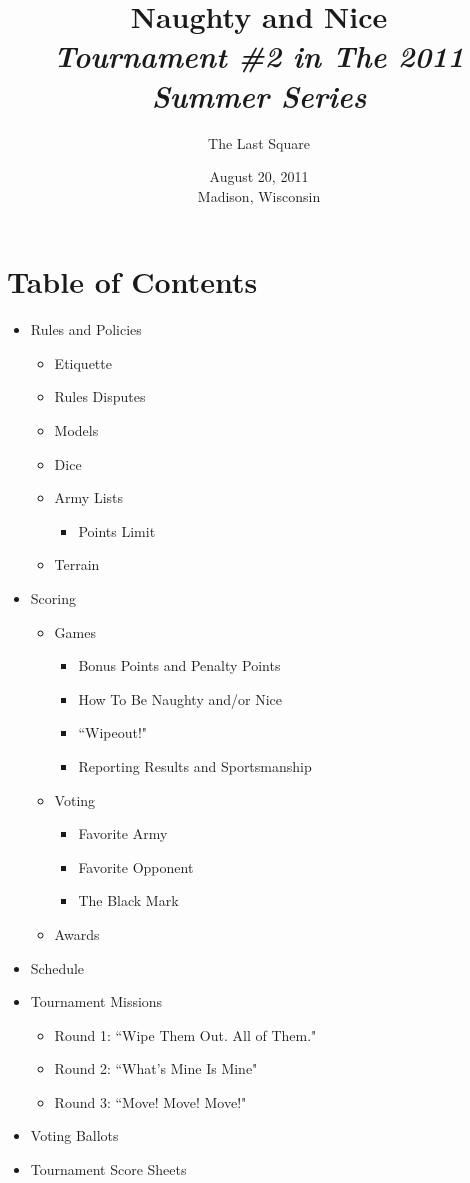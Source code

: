 \documentclass[12pt,titlepage]{article}
\begin{document}
\begin{titlepage}
\title{Naughty and Nice\\{\large\textit{Tournament \#2 in The 2011 Summer Series}}}
\author{The Last Square}
\date{August 20, 2011\\Madison, Wisconsin}
\maketitle
\end{titlepage}

\section*{Table of Contents}

\begin{itemize}
\item Rules and Policies
  \begin{itemize}
  \item Etiquette
  \item Rules Disputes
  \item Models
  \item Dice
  \item Army Lists
    \begin{itemize}
    \item Points Limit
    \end{itemize}
  \item Terrain
  \end{itemize}
\item Scoring
  \begin{itemize}
  \item Games
    \begin{itemize}
    \item Bonus Points and Penalty Points
    \item How To Be Naughty and/or Nice
    \item ``Wipeout!"
    \item Reporting Results and Sportsmanship
    \end{itemize}
  \item Voting
    \begin{itemize}
    \item Favorite Army
    \item Favorite Opponent
    \item The Black Mark
    \end{itemize}
  \item Awards
  \end{itemize}
\item Schedule
\item Tournament Missions
  \begin{itemize}
  \item Round 1: ``Wipe Them Out. All of Them."
  \item Round 2: ``What's Mine Is Mine"
  \item Round 3: ``Move! Move! Move!"
  \end{itemize}
\item Voting Ballots
\item Tournament Score Sheets
\end{itemize}
\end{document}
